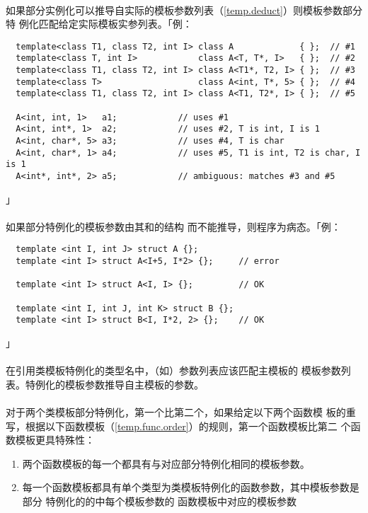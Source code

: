 \paragraph{}
如果部分实例化可以推导自实际的模板参数列表（\ref{temp.deduct}）则模板参数部分特
例化匹配给定实际模板实参列表。「例：
\begin{lstlisting}
  template<class T1, class T2, int I> class A             { };  // #1
  template<class T, int I>            class A<T, T*, I>   { };  // #2
  template<class T1, class T2, int I> class A<T1*, T2, I> { };  // #3
  template<class T>                   class A<int, T*, 5> { };  // #4
  template<class T1, class T2, int I> class A<T1, T2*, I> { };  // #5

  A<int, int, 1>   a1;            // uses #1
  A<int, int*, 1>  a2;            // uses #2, T is int, I is 1
  A<int, char*, 5> a3;            // uses #4, T is char
  A<int, char*, 1> a4;            // uses #5, T1 is int, T2 is char, I is 1
  A<int*, int*, 2> a5;            // ambiguous: matches #3 and #5
\end{lstlisting}」

\paragraph{}
如果部分特例化的模板参数由其和的结构
而不能推导，则程序为病态。「例：
\begin{lstlisting}
  template <int I, int J> struct A {};
  template <int I> struct A<I+5, I*2> {};     // error

  template <int I> struct A<I, I> {};         // OK

  template <int I, int J, int K> struct B {};
  template <int I> struct B<I, I*2, 2> {};    // OK
\end{lstlisting}」

\paragraph{}
在引用类模板特例化的类型名中，（如）参数列表应该匹配主模板的
模板参数列表。特例化的模板参数推导自主模板的参数。

\paragraph{}
对于两个类模板部分特例化，第一个比第二个，如果给定以下两个函数模
板的重写，根据以下函数模板（\ref{temp.func.order}）的规则，第一个函数模板比第二
个函数模板更具特殊性：
\begin{enumerate}
  \item{两个函数模板的每一个都具有与对应部分特例化相同的模板参数。}
  \item{每一个函数模板都具有单个类型为类模板特例化的函数参数，其中模板参数是部分
    特例化的的中每个模板参数的
    函数模板中对应的模板参数}
\end{enumerate}

